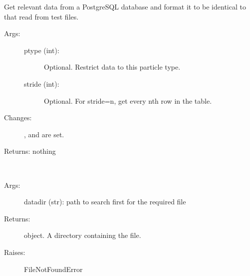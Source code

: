 \documentclass[letterpaper,10pt,english]{sphinxmanual}
\begin{document}
\begin{fulllineitems}
\begin{description}
\begin{description}
\end{description}

\end{description}

\begin{fulllineitems}
\label{\detokenize{galaxy:galaxy.galaxy.Galaxy.read_db}}
Get relevant data from a PostgreSQL database and format it to be 
identical to that read from test files.
\begin{description}
\item[{Args:}] \leavevmode\begin{description}
\item[{ptype (int):}] \leavevmode
Optional. Restrict data to this particle type.

\item[{stride (int):}] \leavevmode
Optional. For stride=n, get every nth row in the table.

\end{description}

\item[{Changes:}] \leavevmode
{},  and  are set.

\end{description}

Returns: nothing

\end{fulllineitems}


\begin{fulllineitems}
\label{\detokenize{galaxy:galaxy.galaxy.Galaxy.get_filepath}}~\begin{description}
\item[{Args:}] \leavevmode
datadir (str): path to search first for the required file

\item[{Returns:}] \leavevmode
{} object. A directory containing the file.

\item[{Raises:}] \leavevmode
FileNotFoundError


\end{description}
\end{fulllineitems}
\end{fulllineitems}
\end{document}
